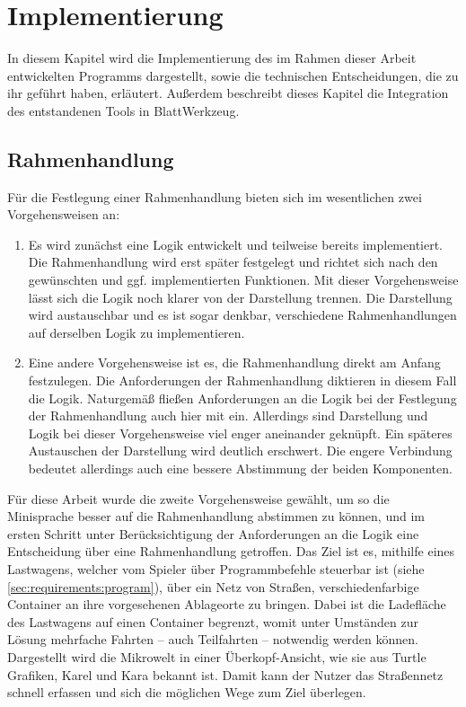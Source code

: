 \chapter{Implementierung}
\label{sec:implementation}

In diesem Kapitel wird die Implementierung des im Rahmen dieser Arbeit entwickelten Programms dargestellt, sowie die technischen Entscheidungen, die zu ihr geführt haben, erläutert. Außerdem beschreibt dieses Kapitel die Integration des entstandenen Tools in BlattWerkzeug.

\section{Rahmenhandlung}
\label{sec:implementation:story}

Für die Festlegung einer Rahmenhandlung bieten sich im wesentlichen zwei Vorgehensweisen an:

\begin{enumerate}[noitemsep]
  \item Es wird zunächst eine Logik entwickelt und teilweise bereits implementiert. Die Rahmenhandlung wird erst später festgelegt und richtet sich nach den gewünschten und ggf. implementierten Funktionen. Mit dieser Vorgehensweise lässt sich die Logik noch klarer von der Darstellung trennen. Die Darstellung wird austauschbar und es ist sogar denkbar, verschiedene Rahmenhandlungen auf derselben Logik zu implementieren.
  \item Eine andere Vorgehensweise ist es, die Rahmenhandlung direkt am Anfang festzulegen. Die Anforderungen der Rahmenhandlung diktieren in diesem Fall die Logik. Naturgemäß fließen Anforderungen an die Logik bei der Festlegung der Rahmenhandlung auch hier mit ein. Allerdings sind Darstellung und Logik bei dieser Vorgehensweise viel enger aneinander geknüpft. Ein späteres Austauschen der Darstellung wird deutlich erschwert. Die engere Verbindung bedeutet allerdings auch eine bessere Abstimmung der beiden Komponenten.
\end{enumerate}

Für diese Arbeit wurde die zweite Vorgehensweise gewählt, um so die Minisprache besser auf die Rahmenhandlung abstimmen zu können, und im ersten Schritt unter Berücksichtigung der Anforderungen an die Logik eine Entscheidung über eine Rahmenhandlung getroffen. Das Ziel ist es, mithilfe eines Lastwagens, welcher vom Spieler über Programmbefehle steuerbar ist (siehe \ref{sec:requirements:program}), über ein Netz von Straßen, verschiedenfarbige Container an ihre vorgesehenen Ablageorte zu bringen. Dabei ist die Ladefläche des Lastwagens auf einen Container begrenzt, womit unter Umständen zur Lösung mehrfache Fahrten -- auch Teilfahrten -- notwendig werden können. Dargestellt wird die Mikrowelt in einer Überkopf-Ansicht, wie sie aus Turtle Grafiken, Karel und Kara bekannt ist. Damit kann der Nutzer das Straßennetz schnell erfassen und sich die möglichen Wege zum Ziel überlegen.

